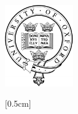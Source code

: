 \begin{titlepage}
\begin{center}
\vspace*{1.0cm}
\Huge
{\bf \xtitle}\\
\vspace*{2.5cm}
{\Large \bf
\xauthor\\
\xcollege\\
}
\vspace*{2.5cm}
\centerline{
\includegraphics[width=30mm]{ThesisFrontmatter/PS/crest}
}
\vspace*{1.5cm}
\normalsize

[0.5cm]
{\bf \xterm}\\

\vspace{2cm}

\end{center}
\end{titlepage}

